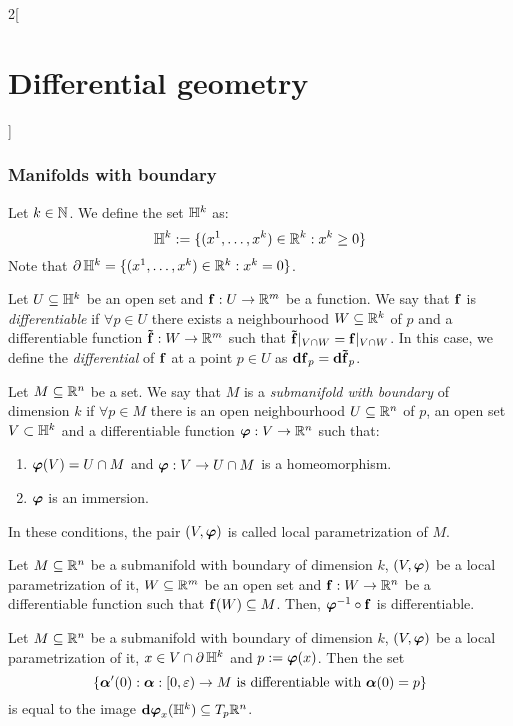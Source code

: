 \documentclass[../../../main.tex]{subfiles}
\begin{document}
\begin{multicols}{2}[\section{Differential geometry}]
  \subsubsection{Manifolds with boundary}
  \begin{definition}
    Let $k\in\mathbb{N}$. We define the set $\mathbb{H}^k$ as: $$\mathbb{H}^k:=\{(x^1,\ldots,x^k)\in\mathbb{R}^k:x^k\geq 0\}$$
    Note that $\operatorname{\partial}{\mathbb{H}^k}=\{(x^1,\ldots,x^k)\in\mathbb{R}^k:x^k=0\}$.
  \end{definition}
  \begin{definition}
    Let $U\subseteq \mathbb{H}^k$ be an open set and $\boldsymbol{\mathrm{f}}:U\rightarrow\mathbb{R}^m$ be a function. We say that $\boldsymbol{\mathrm{f}}$ is \emph{differentiable} if $\forall p\in U$ there exists a neighbourhood $W\subseteq \mathbb{R}^k$ of $p$ and a differentiable function $\boldsymbol{\mathrm{\tilde{f}}}:W\rightarrow\mathbb{R}^m$ such that $\boldsymbol{\mathrm{\tilde{f}}}|_{V\cap W}=\boldsymbol{\mathrm{f}}|_{V\cap W}$. In this case, we define the \emph{differential} of $\boldsymbol{\mathrm{f}}$ at a point $p\in U$ as $\boldsymbol{\mathrm{df}}_p=\boldsymbol{\mathrm{d\tilde{f}}}_p$.
  \end{definition}
  \begin{definition}
    Let $M\subseteq\mathbb{R}^n$ be a set. We say that $M$ is a \emph{submanifold with boundary} of dimension $k$ if $\forall p\in M$ there is an open neighbourhood $U\subseteq\mathbb{R}^n$ of $p$, an open set $V\subset \mathbb{H}^k$ and a differentiable function $\boldsymbol{\mathrm{\varphi}}:V\rightarrow\mathbb{R}^n$ such that:
    \begin{enumerate}
      \item $\boldsymbol{\mathrm{\varphi}}(V)=U\cap M$ and $\boldsymbol{\mathrm{\varphi}}:V\rightarrow U\cap M$ is a homeomorphism.
      \item $\boldsymbol{\mathrm{\varphi}}$ is an immersion.
    \end{enumerate}
    In these conditions, the pair $(V,\boldsymbol{\mathrm{\varphi}})$ is called local parametrization of $M$.
  \end{definition}
  \begin{proposition}
    Let $M\subseteq\mathbb{R}^n$ be a submanifold with boundary of dimension $k$, $(V,\boldsymbol{\mathrm{\varphi}})$ be a local parametrization of it, $W\subseteq \mathbb{R}^m$ be an open set and $\boldsymbol{\mathrm{f}}:W\rightarrow\mathbb{R}^n$ be a differentiable function such that $\boldsymbol{\mathrm{f}}(W)\subseteq M$. Then, ${\boldsymbol{\mathrm{\varphi}}}^{-1}\circ\boldsymbol{\mathrm{f}}$ is differentiable.
  \end{proposition}
  \begin{lemma}
    Let $M\subseteq\mathbb{R}^n$ be a submanifold with boundary of dimension $k$, $(V,\boldsymbol{\mathrm{\varphi}})$ be a local parametrization of it, $x\in V\cap \operatorname{\partial}{\mathbb{H}^k}$ and $p:=\boldsymbol{\mathrm{\varphi}}(x)$. Then the set $$\{\boldsymbol{\mathrm{\alpha}}'(0):\boldsymbol{\mathrm{\alpha}}:[0,\varepsilon)\rightarrow M\text{ is differentiable with }\boldsymbol{\mathrm{\alpha}}(0)=p\}$$ is equal to the image $\boldsymbol{\mathrm{\dd}}\boldsymbol{\mathrm{\varphi}}_x(\mathbb{H}^k)\subseteq T_p\mathbb{R}^n$.

\end{lemma}
\end{multicols}
\end{document}

